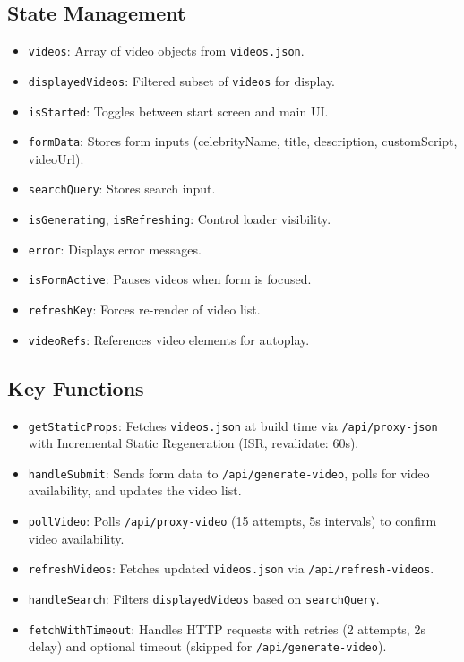 \documentclass[a4paper,12pt]{article}
\begin{document}
\subsection{State Management}
\begin{itemize}
    \item \texttt{videos}: Array of video objects from \texttt{videos.json}.
    \item \texttt{displayedVideos}: Filtered subset of \texttt{videos} for display.
    \item \texttt{isStarted}: Toggles between start screen and main UI.
    \item \texttt{formData}: Stores form inputs (celebrityName, title, description, customScript, videoUrl).
    \item \texttt{searchQuery}: Stores search input.
    \item \texttt{isGenerating}, \texttt{isRefreshing}: Control loader visibility.
    \item \texttt{error}: Displays error messages.
    \item \texttt{isFormActive}: Pauses videos when form is focused.
    \item \texttt{refreshKey}: Forces re-render of video list.
    \item \texttt{videoRefs}: References video elements for autoplay.
\end{itemize}

\subsection{Key Functions}
\begin{itemize}
    \item \texttt{getStaticProps}: Fetches \texttt{videos.json} at build time via \texttt{/api/proxy-json} with Incremental Static Regeneration (ISR, revalidate: 60s).
    \item \texttt{handleSubmit}: Sends form data to \texttt{/api/generate-video}, polls for video availability, and updates the video list.
    \item \texttt{pollVideo}: Polls \texttt{/api/proxy-video} (15 attempts, 5s intervals) to confirm video availability.
    \item \texttt{refreshVideos}: Fetches updated \texttt{videos.json} via \texttt{/api/refresh-videos}.
    \item \texttt{handleSearch}: Filters \texttt{displayedVideos} based on \texttt{searchQuery}.
    \item \texttt{fetchWithTimeout}: Handles HTTP requests with retries (2 attempts, 2s delay) and optional timeout (skipped for \texttt{/api/generate-video}).
\end{itemize}
\end{document}
